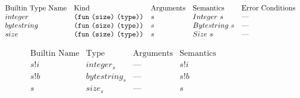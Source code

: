 \documentclass[../main.tex]{subfiles}
\begin{document}
    
\begin{figure*}[t]
    \footnotesize
    \centering
    
    \[\begin{array}{lllll}
        \textrm{Builtin Type Name} & \textrm{Kind} & \textrm{Arguments} & \textrm{Semantics} & \textrm{Error Conditions}\\
        
        integer & \texttt{(} \texttt{fun} ~ \texttt{(} \texttt{size} \texttt{)}{} ~ \texttt{(} \texttt{type} \texttt{)}{} \texttt{)} & s & Integer ~ s & \textrm{---}\\
        
        bytestring & \texttt{(} \texttt{fun} ~ \texttt{(} \texttt{size} \texttt{)}{} ~ \texttt{(} \texttt{type} \texttt{)}{} \texttt{)} & s & Bytestring ~ s & \textrm{---}\\
        
        size & \texttt{(} \texttt{fun} ~ \texttt{(} \texttt{size} \texttt{)}{} ~ \texttt{(} \texttt{type} \texttt{)}{} \texttt{)} & s & Size ~ s & \textrm{---}\\
    \end{array}\]
    
    \[\begin{array}{lllll}
        \textrm{Builtin Name} & \textrm{Type} & \textrm{Arguments} & \textrm{Semantics}\\
        
        s!i   & integer_s      &   \textrm{---}   &    s!i\\
        
        s!b   & bytestring_s   &   \textrm{---}   &    s!b    &\\
        
        s     & size_s         &   \textrm{---}   &    s      &\\
        

\end{array}\]
\end{figure*}
\end{document}
